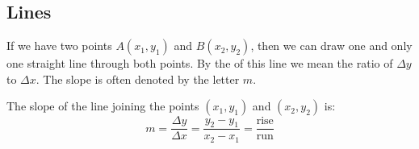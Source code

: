%
%
%
%



\subsection{Lines}\label{sec:lines}
If we have two  points $A(x_1,y_1)$ and $B(x_2,y_2)$, then we can draw one
and only one straight line through both points.  By the  of this line
we mean the ratio of $\Delta y$ to $\Delta x$.  The slope is often denoted by the letter $m$. \\

\begin{formulabox}
The slope of the line joining the points $(x_1,y_1)$ and $(x_2,y_2)$ is:
$$m=\frac{\Delta y}{\Delta x}=\frac{y_2-y_1}{x_2-x_1}=\frac{\mbox{rise}}{\mbox{run}}$$
\end{formulabox}

